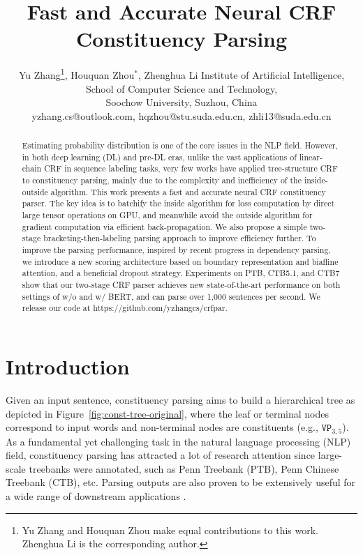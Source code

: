\documentclass{article}
\title{Fast and Accurate Neural CRF Constituency Parsing}
\author{
Yu Zhang\thanks{Yu Zhang and Houquan Zhou make equal contributions to this work. Zhenghua Li is the corresponding author.},
Houquan Zhou$^{\ast}$,
Zhenghua Li
\affiliations
Institute of Artificial Intelligence, School of Computer Science and Technology, \\ Soochow University, Suzhou, China \\
\emails
yzhang.cs@outlook.com,
hqzhou@stu.suda.edu.cn,
zhli13@suda.edu.cn
}
\begin{document}
\maketitle

\begin{abstract}
\label{section:abstract}

Estimating probability distribution is one of the core issues in the NLP field. However, in both deep learning (DL) and pre-DL eras, unlike the vast applications of linear-chain CRF in sequence labeling tasks, very few works have applied tree-structure CRF to constituency parsing, mainly due to the complexity and inefficiency of the inside-outside algorithm.
This work presents a fast and accurate neural CRF constituency parser. The key idea is to batchify the inside algorithm for loss computation by direct large tensor operations on GPU, and meanwhile avoid the outside algorithm for gradient computation via efficient back-propagation.
We also propose a simple two-stage bracketing-then-labeling parsing approach to improve efficiency further.
To improve the parsing performance, inspired by recent progress in dependency parsing, we introduce a new scoring architecture
based on boundary representation and biaffine attention, and a beneficial dropout strategy.
Experiments on PTB, CTB5.1, and CTB7 show that our two-stage CRF parser achieves new state-of-the-art performance on both settings of w/o and w/ BERT, and can parse over 1,000 sentences per second.
We release our code at https://github.com/yzhangcs/crfpar.

\end{abstract} \section{Introduction}
\label{section:introduction}

Given an input sentence, constituency parsing aims to build a hierarchical tree as depicted in Figure~\ref{fig:const-tree-original}, where the leaf or terminal nodes correspond to input words and non-terminal nodes are constituents (e.g., $\texttt{VP}_{3,5}$).
As a fundamental yet challenging task in the natural language processing (NLP) field, constituency parsing has attracted a lot of research attention since large-scale treebanks were annotated,  such as Penn Treebank (PTB), Penn Chinese Treebank (CTB), etc.
Parsing outputs are also proven to be extensively useful for a wide range of downstream applications \cite{akoury-etal-2019-syntactically,wang-etal-2018-tree}.
\end{document}
